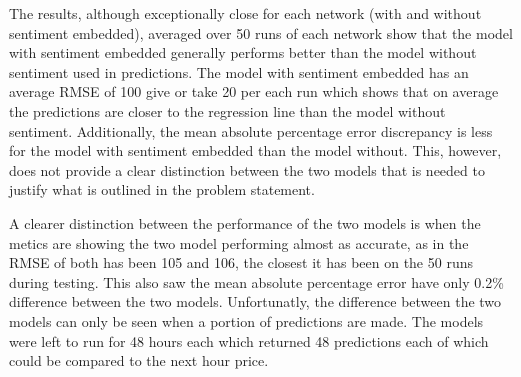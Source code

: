 \documentclass[oneside, 12pt]{article}
\begin{document}
	The results, although exceptionally close for each network (with and without sentiment embedded), averaged over 50 runs of each network show that the model with sentiment embedded generally performs better than the model without sentiment used in predictions. The model with sentiment embedded has an average RMSE of 100 give or take 20 per each run which shows that on average the predictions are closer to the regression line than the model without sentiment. Additionally, the mean absolute percentage error discrepancy is less for the model with sentiment embedded than the model without. This, however, does not provide a clear distinction between the two models that is needed to justify what is outlined in the problem statement.
	
	A clearer distinction between the performance of the two models is when the metics are showing the two model performing almost as accurate, as in the RMSE of both has been 105 and 106, the closest it has been on the 50 runs during testing. This also saw the mean absolute percentage error have only 0.2\% difference between the two models. Unfortunatly, the difference between the two models can only be seen when a portion of predictions are made. The models were left to run for 48 hours each which returned 48 predictions each of which could be compared to the next hour price.
	
\end{document}
